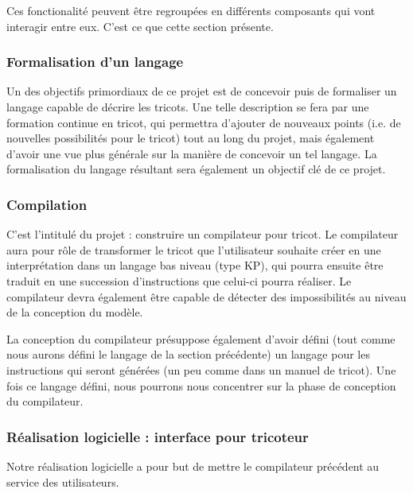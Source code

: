 \documentclass{article}
\begin{document}
Ces fonctionalité peuvent être regroupées en différents composants qui vont interagir entre eux. C'est ce que cette section présente.

\subsubsection{Formalisation d'un langage}


Un des objectifs primordiaux de ce projet est de concevoir puis de formaliser un langage capable de décrire les tricots.
Une telle description se fera par une formation continue en tricot, qui permettra d'ajouter de nouveaux points (i.e. de nouvelles
possibilités pour le tricot) tout au long du projet, mais également d'avoir une vue plus générale sur la manière de concevoir un tel
langage. La formalisation du langage résultant sera également un objectif clé de ce projet.

\subsubsection{Compilation}

C'est l'intitulé du projet : construire un compilateur pour tricot. Le compilateur aura pour rôle de transformer le tricot que
l'utilisateur souhaite créer en une interprétation dans un langage bas niveau (type KP), qui pourra ensuite être traduit en une succession
d'instructions que celui-ci pourra réaliser.
Le compilateur devra également être capable de détecter des impossibilités au niveau de la conception du modèle.

La conception du compilateur présuppose également d'avoir défini (tout comme nous aurons défini le langage de la section précédente) un
langage pour les instructions qui seront générées (un peu comme dans un manuel de tricot).
Une fois ce langage défini, nous pourrons nous concentrer sur la phase de conception du compilateur.

\subsubsection{Réalisation logicielle : interface pour tricoteur}

Notre réalisation logicielle a pour but de mettre le compilateur précédent au service des utilisateurs.
\end{document}
